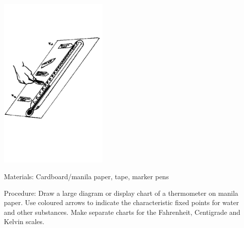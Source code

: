 \begin{multicols}{2}
\begin{center}
\includegraphics[width=0.4\textwidth]{./img/source/fixed-points.png}
\end{center}

\begin{description*}
\item[Materials:]{Cardboard/manila paper, tape, marker pens}
\item[Procedure:]{Draw a large diagram or display chart of a thermometer on manila paper. Use coloured arrows to indicate the characteristic fixed points for water and other substances. Make separate charts for the Fahrenheit, Centigrade and Kelvin scales.}
\end{description*}

\vfill
\pagebreak





\end{multicols}


